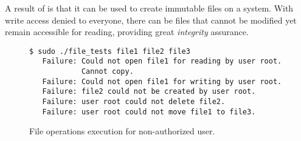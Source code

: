 \par A result of  is that it can be used to create immutable files on a system. With write access denied to everyone, there can be files that cannot be modified yet remain accessible for reading, providing great \emph{integrity} assurance.

\begin{figure}[ht]
	\centering
	\footnotesize{\selectfont 
		\begin{lstlisting}
$ sudo ./file_tests file1 file2 file3
   Failure: Could not open file1 for reading by user root. 
            Cannot copy.
   Failure: Could not open file1 for writing by user root.
   Failure: file2 could not be created by user root.
   Failure: user root could not delete file2.
   Failure: user root could not move file1 to file3.

		\end{lstlisting}}
	\caption{File operations execution for non-authorized user.}
	\label{fig:results2}
\end{figure}




